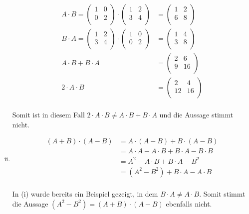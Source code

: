 \documentclass{article}
\begin{document}
\begin{enumerate}[(i)]
  \begin{align*}
    A \cdot B =
    \begin{pmatrix}
      1 & 0 \\
      0 & 2 \\
    \end{pmatrix}
    \cdot
    \begin{pmatrix}
      1 & 2 \\
      3 & 4 \\
    \end{pmatrix}
    &=
    \begin{pmatrix}
      1 & 2 \\
      6 & 8 \\
    \end{pmatrix} \\
    B \cdot A =
    \begin{pmatrix}
      1 & 2 \\
      3 & 4 \\
    \end{pmatrix}
    \cdot
    \begin{pmatrix}
      1 & 0 \\
      0 & 2 \\
    \end{pmatrix}
    &=
    \begin{pmatrix}
      1 & 4 \\
      3 & 8 \\
    \end{pmatrix} \\
    A \cdot B + B \cdot A
    &=
    \begin{pmatrix}
      2 & 6 \\
      9 & 16 \\
    \end{pmatrix} \\
    2 \cdot A \cdot B
    &=
    \begin{pmatrix}
      2  & 4  \\
      12 & 16 \\
    \end{pmatrix} \\
  \end{align*}

  Somit ist in diesem Fall $2 \cdot A \cdot B \ne A \cdot B + B \cdot A$ und die Aussage stimmt nicht.

\item
  \begin{align*}
    (A + B) \cdot (A - B) &= A \cdot (A - B) + B \cdot (A - B) \\
                          &= A \cdot A - A \cdot B + B \cdot A - B \cdot B \\
                          &= A^2 - A \cdot B + B \cdot A - B^2 \\
                          &= (A^2 - B^2) + B \cdot A - A \cdot B \\
  \end{align*}

  In (i) wurde bereits ein Beispiel gezeigt, in dem $B \cdot A \ne A \cdot B$. Somit stimmt
  die Aussage $(A^2 - B^2) = (A + B) \cdot (A - B)$ ebenfalls nicht.
\end{enumerate}
\end{document}
